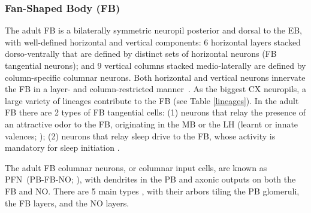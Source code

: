         \subsubsection{Fan-Shaped Body (FB)}
        The adult FB is a bilaterally symmetric neuropil posterior and dorsal to the EB, with well-defined horizontal and vertical components: 6 horizontal layers stacked dorso-ventrally that are defined by distinct sets of horizontal neurons (FB tangential neurons); and 9 vertical columns stacked medio-laterally are defined by column-specific columnar neurons.
        Both horizontal and vertical neurons innervate the FB in a layer- and column-restricted manner~\citep{heinze2017unraveling}.
        As the biggest CX neuropils, a large variety of lineages contribute to the FB (see Table \ref{lineages}).
        In the adult FB there are 2 types of FB tangential cells: (1) neurons that relay the presence of an attractive odor to the FB, originating in the MB or the LH (learnt or innate valences; \citep{hulse2021connectome}); (2) neurons that relay sleep drive to the FB, whose activity is mandatory for sleep initiation \citep{ShaferKeene2021sleep}. %
        

        The adult FB columnar neurons, or columnar input cells, are known as PFN~(PB-FB-NO; \citep{wolff2015neuroarchitecture}), with dendrites in the PB and axonic outputs on both the FB and NO.
        There are 5 main types \citep{hulse2021connectome}, with their arbors tiling the PB glomeruli, the FB layers, and the NO layers.

